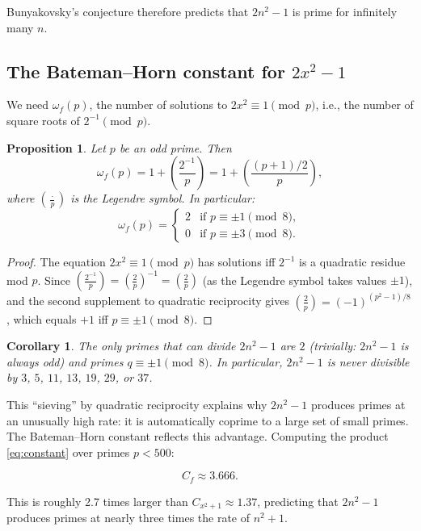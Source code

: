 \documentclass[11pt,a4paper]{article}
\newtheorem{proposition}[theorem]{Proposition}
\newtheorem{corollary}[theorem]{Corollary}
\newcommand{\Leg}[2]{\left(\frac{#1}{#2}\right)}
\begin{document}
Bunyakovsky's conjecture therefore predicts that $2n^2 - 1$ is prime for infinitely many $n$.

\subsection{The Bateman--Horn constant for $2x^2 - 1$}

We need $\omega_f(p)$, the number of solutions to $2x^2 \equiv 1 \pmod{p}$, i.e., the number of square roots of $2^{-1} \pmod{p}$.

\begin{proposition}\label{prop:roots}
Let $p$ be an odd prime. Then
\[
    \omega_f(p) = 1 + \Leg{2^{-1}}{p} = 1 + \Leg{(p+1)/2}{p},
\]
where $\Leg{\cdot}{p}$ is the Legendre symbol. In particular:
\[
    \omega_f(p) = \begin{cases}
        2 & \text{if } p \equiv \pm 1 \pmod{8}, \\
        0 & \text{if } p \equiv \pm 3 \pmod{8}.
    \end{cases}
\]
\end{proposition}

\begin{proof}
The equation $2x^2 \equiv 1 \pmod{p}$ has solutions iff $2^{-1}$ is a quadratic residue mod $p$. Since $\Leg{2^{-1}}{p} = \Leg{2}{p}^{-1} = \Leg{2}{p}$ (as the Legendre symbol takes values $\pm 1$), and the second supplement to quadratic reciprocity gives $\Leg{2}{p} = (-1)^{(p^2-1)/8}$, which equals $+1$ iff $p \equiv \pm 1 \pmod 8$.
\end{proof}

\begin{corollary}
The only primes that can divide $2n^2 - 1$ are $2$ (trivially: $2n^2 - 1$ is always odd) and primes $q \equiv \pm 1 \pmod{8}$. In particular, $2n^2 - 1$ is never divisible by $3$, $5$, $11$, $13$, $19$, $29$, or $37$.
\end{corollary}

This ``sieving'' by quadratic reciprocity explains why $2n^2 - 1$ produces primes at an unusually high rate: it is automatically coprime to a large set of small primes. The Bateman--Horn constant reflects this advantage. Computing the product \eqref{eq:constant} over primes $p < 500$:

\[
    C_f \approx 3.666.
\]

This is roughly 2.7 times larger than $C_{x^2+1} \approx 1.37$, predicting that $2n^2 - 1$ produces primes at nearly three times the rate of $n^2 + 1$.
\end{document}

